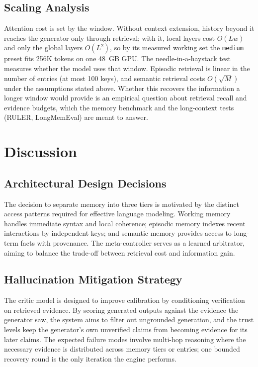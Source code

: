 \documentclass{article}
\begin{document}
\subsection{Scaling Analysis}

Attention cost is set by the window. Without context extension, history beyond it reaches the generator only through retrieval; with it, local layers cost $O(Lw)$ and only the global layers $O(L^2)$, so by its measured working set the \texttt{medium} preset fits 256K tokens on one 48~GB GPU. The needle-in-a-haystack test measures whether the model uses that window. Episodic retrieval is linear in the number of entries (at most 100 keys), and semantic retrieval costs $O(\sqrt{M})$ under the assumptions stated above. Whether this recovers the information a longer window would provide is an empirical question about retrieval recall and evidence budgets, which the memory benchmark and the long-context tests (RULER, LongMemEval) are meant to answer.

\section{Discussion}

\subsection{Architectural Design Decisions}

The decision to separate memory into three tiers is motivated by the distinct access patterns required for effective language modeling. Working memory handles immediate syntax and local coherence; episodic memory indexes recent interactions by independent keys; and semantic memory provides access to long-term facts with provenance. The meta-controller serves as a learned arbitrator, aiming to balance the trade-off between retrieval cost and information gain.

\subsection{Hallucination Mitigation Strategy}

The critic model is designed to improve calibration by conditioning verification on retrieved evidence. By scoring generated outputs against the evidence the generator saw, the system aims to filter out ungrounded generation, and the trust levels keep the generator's own unverified claims from becoming evidence for its later claims. The expected failure modes involve multi-hop reasoning where the necessary evidence is distributed across memory tiers or entries; one bounded recovery round is the only iteration the engine performs.
\end{document}
